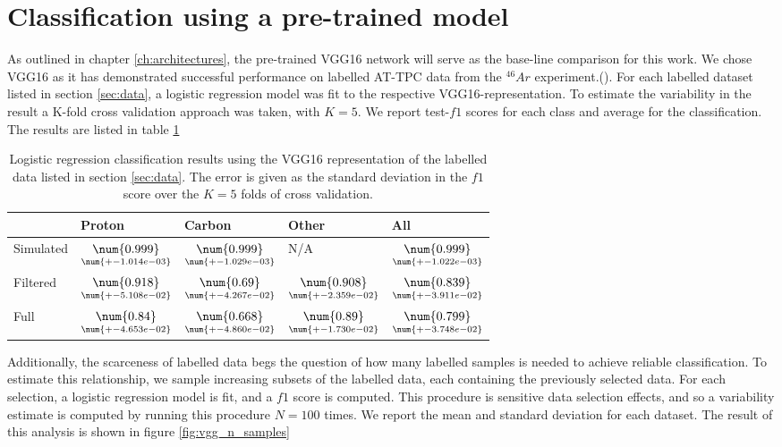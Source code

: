 \section{Classification using a pre-trained model}

As outlined in chapter \ref{ch:architectures}, the pre-trained VGG16 network will serve as the base-line comparison for this work. We chose VGG16 as it has demonstrated successful performance on labelled AT-TPC data from the $^{46}Ar$ experiment.(\cite{Kuchera2019}). For each labelled dataset listed in section \ref{sec:data}, a logistic regression model was fit to the respective VGG16-representation. To estimate the variability in the result a K-fold cross validation approach was taken, with $K=5$. We report test-$f1$ scores for each class and average for the classification. The results are listed in table \ref{tab:vgg_results}

\begin{table}
\centering
\caption[VGG classification results]{Logistic regression classification results using the VGG16 representation of the labelled data listed in section \ref{sec:data}. The error is given as the standard deviation in the $f1$ score over the $K=5$ folds of cross validation.}\label{tab:vgg_results}
\begin{tabular}{lllll}
\toprule
{} & Proton & Carbon & Other & All \\
\midrule
Simulated &  $\underset{\num{+- 1.014e-03 }  }{\num{ 0.999 } }$ &  $\underset{\num{+- 1.029e-03 }  }{\num{ 0.999 } }$ &  N/A &  $\underset{\num{+- 1.022e-03 }  }{\num{ 0.999 } }$ \\
Filtered  &  $\underset{\num{+- 5.108e-02 }  }{\num{ 0.918 } }$ &  $\underset{\num{+- 4.267e-02 }  }{\num{ 0.69 } }$ &  $\underset{\num{+- 2.359e-02 }  }{\num{ 0.908 } }$ &  $\underset{\num{+- 3.911e-02 }  }{\num{ 0.839 } }$ \\
Full      &  $\underset{\num{+- 4.653e-02 }  }{\num{ 0.84 } }$ &  $\underset{\num{+- 4.860e-02 }  }{\num{ 0.668 } }$ &  $\underset{\num{+- 1.730e-02 }  }{\num{ 0.89 } }$ &  $\underset{\num{+- 3.748e-02 }  }{\num{ 0.799 } }$ \\
\bottomrule
\end{tabular}
\end{table}

 Additionally, the scarceness of labelled data begs the question of how many labelled samples is needed to achieve reliable classification. To estimate this relationship, we sample increasing subsets of the labelled data, each containing the previously selected data. For each selection, a logistic regression model is fit, and a $f1$ score is computed. This procedure is sensitive data selection effects, and so a variability estimate is computed by running this procedure $N=100$ times. We report the mean and standard deviation for each dataset. The result of this analysis is shown in figure \ref{fig:vgg_n_samples}

